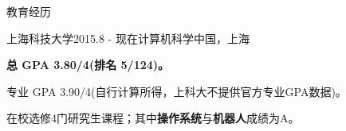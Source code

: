\documentclass{resume} %
\begin{document}

\begin{rSection}{教育经历}

\begin{rSubsection}
  {上海科技大学}{2015.8 - 现在}{计算机科学}{中国，上海}
    \item \textbf{总 GPA 3.80/4(排名 5/124)。}
    \item 专业 GPA 3.90/4(自行计算所得，上科大不提供官方专业GPA数据)。
    \item 在校选修4门研究生课程；其中\textbf{操作系统}与\textbf{机器人}成绩为A。
\end{rSubsection}

\end{rSection}
\end{document}
